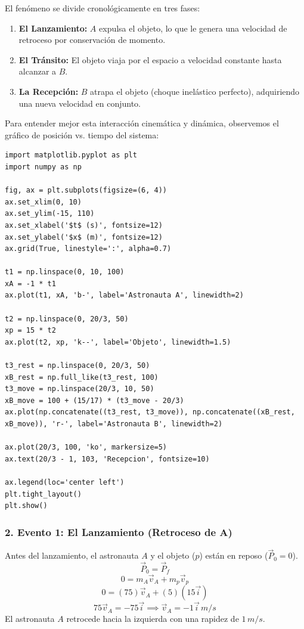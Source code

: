 \documentclass[12pt, a4paper]{article}
\begin{document}
El fenómeno se divide cronológicamente en tres fases:
\begin{enumerate}
    \item \textbf{El Lanzamiento:} $A$ expulsa el objeto, lo que le genera una velocidad de retroceso por conservación de momento.
    \item \textbf{El Tránsito:} El objeto viaja por el espacio a velocidad constante hasta alcanzar a $B$.
    \item \textbf{La Recepción:} $B$ atrapa el objeto (choque inelástico perfecto), adquiriendo una nueva velocidad en conjunto.
\end{enumerate}

Para entender mejor esta interacción cinemática y dinámica, observemos el gráfico de posición vs. tiempo del sistema:

\begin{lstlisting}
import matplotlib.pyplot as plt
import numpy as np

fig, ax = plt.subplots(figsize=(6, 4))
ax.set_xlim(0, 10)
ax.set_ylim(-15, 110)
ax.set_xlabel('$t$ (s)', fontsize=12)
ax.set_ylabel('$x$ (m)', fontsize=12)
ax.grid(True, linestyle=':', alpha=0.7)

t1 = np.linspace(0, 10, 100)
xA = -1 * t1
ax.plot(t1, xA, 'b-', label='Astronauta A', linewidth=2)

t2 = np.linspace(0, 20/3, 50)
xp = 15 * t2
ax.plot(t2, xp, 'k--', label='Objeto', linewidth=1.5)

t3_rest = np.linspace(0, 20/3, 50)
xB_rest = np.full_like(t3_rest, 100)
t3_move = np.linspace(20/3, 10, 50)
xB_move = 100 + (15/17) * (t3_move - 20/3)
ax.plot(np.concatenate((t3_rest, t3_move)), np.concatenate((xB_rest, xB_move)), 'r-', label='Astronauta B', linewidth=2)

ax.plot(20/3, 100, 'ko', markersize=5)
ax.text(20/3 - 1, 103, 'Recepcion', fontsize=10)

ax.legend(loc='center left')
plt.tight_layout()
plt.show()
\end{lstlisting}

\subsubsection*{2. Evento 1: El Lanzamiento (Retroceso de A)}
Antes del lanzamiento, el astronauta $A$ y el objeto ($p$) están en reposo ($\vec{P}_0 = 0$).
\[ \vec{P}_0 = \vec{P}_f \]
\[ 0 = m_A \vec{v}_A + m_p \vec{v}_p \]
\[ 0 = (75) \vec{v}_A + (5)(15 \vec{i}) \]
\[ 75 \vec{v}_A = -75 \vec{i} \implies \vec{v}_A = -1 \vec{i} \, \si{m/s} \]
El astronauta $A$ retrocede hacia la izquierda con una rapidez de $1 \, \si{m/s}$.
\end{document}
